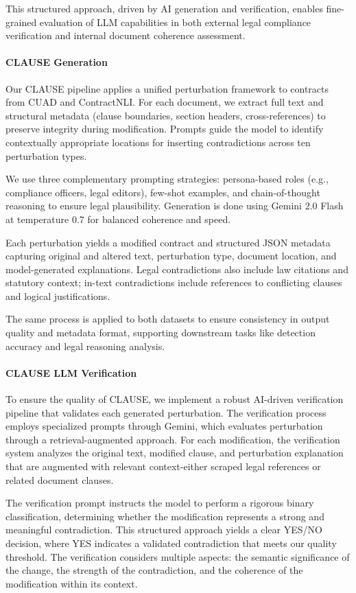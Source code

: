 \documentclass[11pt]{article}
\newcommand{\datasetName}{{\sc CLAUSE}\xspace}
\begin{document}
This structured approach, driven by AI generation and verification, enables fine-grained evaluation of LLM capabilities in both external legal compliance verification and internal document coherence assessment.


\paragraph{\datasetName Generation}
Our \datasetName pipeline applies a unified perturbation framework to contracts from CUAD and ContractNLI. For each document, we extract full text and structural metadata (clause boundaries, section headers, cross-references) to preserve integrity during modification. Prompts guide the model to identify contextually appropriate locations for inserting contradictions across ten perturbation types.

We use three complementary prompting strategies: persona-based roles (e.g., compliance officers, legal editors), few-shot examples, and chain-of-thought reasoning to ensure legal plausibility. Generation is done using Gemini 2.0 Flash at temperature 0.7 for balanced coherence and speed.

Each perturbation yields a modified contract and structured JSON metadata capturing original and altered text, perturbation type, document location, and model-generated explanations. Legal contradictions also include law citations and statutory context; in-text contradictions include references to conflicting clauses and logical justifications.

The same process is applied to both datasets to ensure consistency in output quality and metadata format, supporting downstream tasks like detection accuracy and legal reasoning analysis.


\paragraph{\datasetName LLM Verification}
To ensure the quality of \datasetName, we implement a robust AI-driven verification pipeline that validates each generated perturbation. The verification process employs specialized prompts through Gemini, which evaluates perturbation through a retrieval-augmented approach. For each modification, the verification system analyzes the original text, modified clause, and perturbation explanation that are augmented with relevant context-either scraped legal references or related document clauses. 

The verification prompt instructs the model to perform a rigorous binary classification, determining whether the modification represents a strong and meaningful contradiction. This structured approach yields a clear YES/NO decision, where YES indicates a validated contradiction that meets our quality threshold. The verification considers multiple aspects: the semantic significance of the change, the strength of the contradiction, and the coherence of the modification within its context. 
\end{document}
